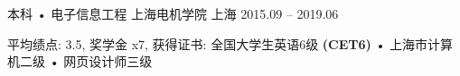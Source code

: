 

\begin{cventries}

  \cventry
    {本科 • 电子信息工程} %
    {上海电机学院} %
    {上海} %
    {2015.09 -- 2019.06} %
    {
      \begin{cvitems} %
        \item {平均绩点: 3.5, 奖学金 x7, 获得证书: 全国大学生英语6级 \textbf{(CET6)} • 上海市计算机二级 • 网页设计师三级}
      \end{cvitems}
    }

\end{cventries}
